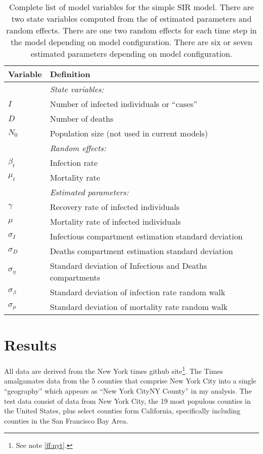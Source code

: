 \documentclass[12pt,letterpaper]{article}
\begin{document}
\begin{table}
\caption{Complete list of model variables for the simple SIR model.
There are two state variables computed from the of estimated
parameters and random effects.
There are one two random effects for each time step in the model
depending on model configuration.
There are six or seven estimated parameters depending on model
configuration. 
}
\label{tab:allvars1}
\begin{center}
\begin{tabular}{ll}
\hline
Variable & Definition\\
\hline
\hline
       & {\it State variables:}\\
$I$      & Number of infected individuals or ``cases''\\
$D$      & Number of deaths\\
$N_0$    & Population size (not used in current models)\\
       & {\it Random effects:}\\
$\beta_t$ & Infection rate\\
$\mu_t$   & Mortality rate\\
       & {\it Estimated parameters:}\\
$\gamma$   & Recovery rate of infected individuals\\
$\mu$      & Mortality rate of infected individuals\\
$\sigma_I$ & Infectious compartment estimation standard deviation\\
$\sigma_D$ & Deaths compartment estimation standard deviation\\
$\sigma_\eta$ & Standard deviation of Infectious and Deaths compartments\\
$\sigma_\beta$ & Standard deviation of infection rate random walk\\
$\sigma_\mu$ & Standard deviation of mortality rate random walk\\
\hline
\end{tabular}
\end{center}
\end{table}

\section*{Results}

All data are derived from the New York times github 
site\footnote{See note \ref{ff:nyt}.}.
The Times amalgamates data
from the 5 counties that comprise New York City into a single
``geography'' which appears as ``New York CityNY County'' in my
analysis. The test data consist of data from New York City, the 19
most populous counties in the United States, plus select
counties form California, specifically including counties in the San
Francisco Bay Area.
\end{document}
